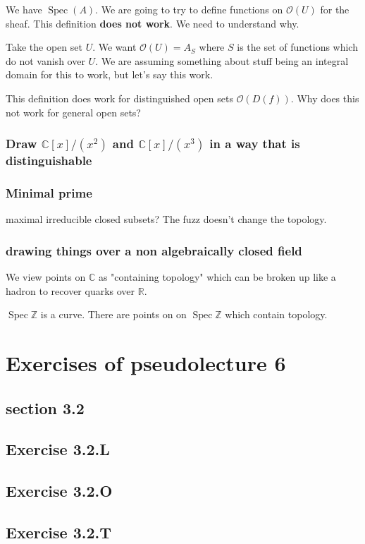 \documentclass{book}
\newcommand{\Z}{\ensuremath{\mathbb{Z}}}
\newcommand{\C}{\ensuremath{\mathbb{C}}}
\newcommand{\R}{\ensuremath{\mathbb{R}}}
\renewcommand{\O}{\ensuremath{\mathcal{O}}}
\newcommand{\spec}{\operatorname{Spec}}
\theoremstyle{definition}
\begin{document}
We have $\spec(A)$. We are going to try to define functions on $\O(U)$ for the
sheaf. This definition \textbf{does not work}. We need to understand why.


Take the open set $U$. We want $\O(U) = A_{S}$ where $S$ is the set of functions
which do not vanish over $U$. We are assuming something about stuff being
an integral domain for this to work, but let's say this work.

This definition does work for distinguished open sets $\O(D(f))$. Why does this
not work for general open sets?

\subsection{Draw $\C[x]/(x^2)$ and $\C[x]/(x^3)$ in a way that is distinguishable}

\subsection{Minimal prime}
maximal irreducible closed subsets? The fuzz doesn't change the topology. 



\subsection{drawing things over a non algebraically closed field}
We view points on $\C$ as "containing topology" which can be broken
up like a hadron to recover quarks over $\R$.

$\spec \Z$ is a curve. There are points on on $\spec \Z$ which contain
topology.

\chapter{Exercises of pseudolecture 6}
\section{section 3.2}
\section{Exercise 3.2.L}
\section{Exercise 3.2.O} 
\section{Exercise 3.2.T}
\end{document}
